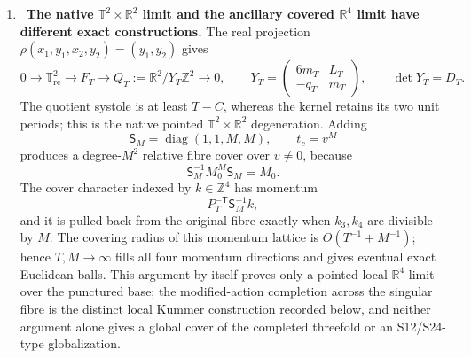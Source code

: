 \begin{enumerate}[leftmargin=1.8em,itemsep=.65em]
\[\]
This is the gap of the explicitly declared Euclidean quotient metric.  Its
unit-volume rescaling is a different operator family and obeys
\[
 \widehat g_T=D_T^{-1/2}g_T,\qquad
 \lambda_1(F_T,\widehat g_T)
 =\frac{4\pi^2}{T}\left(
 1+\frac{-H-B/2+2\min\{B,0\}}T+O(T^{-2})\right)
 \longrightarrow0.
\]
The degeneration has an exact fixed-energy density, not merely a lowest-mode
estimate.  Counting Fourier multiplicities by
\[
 N_T(E)=\#\{k\in\mathbb Z^4:
 4\pi^2\lVert P_T^{-\mathsf T}k\rVert^2\le E\},
 \qquad R_E^2=\frac{E}{4\pi^2},
\]
one has, for every fixed \(E\ge0\),
\[
 N_T(E)=\pi D_T\sum_{n\in\mathbb Z^2}
 (R_E^2-\lVert n\rVert^2)_+ +O_E(T+1),
 \qquad (x)_+=\max\{x,0\}.
\]
The sum is finite.  In particular, below the first transverse threshold,
\[
 0<E<4\pi^2
 \quad\Longrightarrow\quad
 N_T(E)=\frac{E}{4\pi}D_T+O_E(T+1)
       =\frac{E}{4\pi}T^2+O_E(T).
\]
The proof writes the admissible \((r,s)\)-indices for each fixed transverse
\(n\in\mathbb Z^2\) as the lattice points in a translated ellipse of area
\(\pi D_T(R_E^2-\lVert n\rVert^2)\) and perimeter \(O_E(T+1)\), then applies
the elementary planar area--perimeter lattice bound.  Thus the remainder is
uniform in the otherwise unrestricted real parts of the periods.  See
\cref{cusp-spec-counting}.

Normalized Haar measure in the angular-coordinate direct integral is a
unitary measure convention, not this metric rescaling.  See
 \cref{cusp-spec-exact-dual-lattice,cusp-spec-shortest-modes,%
 cusp-spec-unit-volume,cusp-spec-counting}.

\item \Verified\ \textbf{The native
\(\mathbb T^2\times\mathbb R^2\) limit and the ancillary covered
\(\mathbb R^4\) limit have different exact constructions.}
The real projection \(\rho(x_1,y_1,x_2,y_2)=(y_1,y_2)\) gives
\[
 0\longrightarrow\mathbb T^2_{\mathrm{re}}
 \longrightarrow F_T
 \longrightarrow Q_T:=\mathbb R^2/Y_T\mathbb Z^2
 \longrightarrow0,
 \qquad
 Y_T=\begin{pmatrix}6m_T&L_T\\-q_T&m_T\end{pmatrix},
 \qquad \det Y_T=D_T.
\]
The quotient systole is at least \(T-C\), whereas the kernel retains its
two unit periods; this is the native pointed
\(\mathbb T^2\times\mathbb R^2\) degeneration.  Adding
\[
 \mathsf S_M=\operatorname{diag}(1,1,M,M),\qquad
 t_c=v^M
\]
produces a degree-\(M^2\) relative fibre cover over \(v\ne0\), because
\[
 \mathsf S_M^{-1}M_0^M\mathsf S_M=M_0.
\]
The cover character indexed by \(k\in\mathbb Z^4\) has momentum
\[
 P_T^{-\mathsf T}\mathsf S_M^{-1}k,
\]
and it is pulled back from the original fibre exactly when
\(k_3,k_4\) are divisible by \(M\).  The covering radius of this momentum
 lattice is \(O(T^{-1}+M^{-1})\); hence \(T,M\to\infty\) fills all four
 momentum directions and gives eventual exact Euclidean balls.  This argument
 by itself proves only a pointed local \(\mathbb R^4\) limit over the
 punctured base; the modified-action completion across the singular fibre is
 the distinct local Kummer construction recorded below, and neither argument
 alone gives a global cover of the completed threefold or an S12/S24-type
 globalization.


\end{enumerate}

